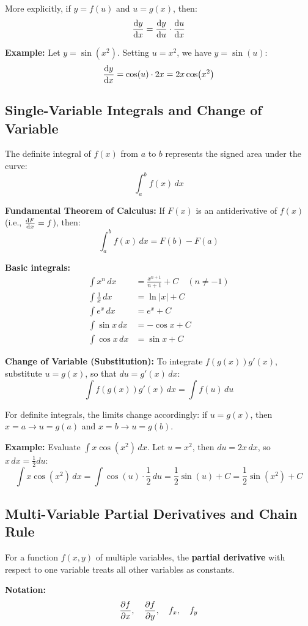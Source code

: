 More explicitly, if $y = f(u)$ and $u = g(x)$, then:
\[
\dv{y}{x} = \dv{y}{u} \cdot \dv{u}{x}
\]

\textbf{Example:} Let $y = \sin(x^2)$. Setting $u = x^2$, we have $y = \sin(u)$:
\[
\dv{y}{x} = \cos(u) \cdot 2x = 2x\cos(x^2)
\]

\subsection{Single-Variable Integrals and Change of Variable}

The definite integral of $f(x)$ from $a$ to $b$ represents the signed area under the curve:
\[
\int_a^b f(x) \, dx
\]

\textbf{Fundamental Theorem of Calculus:} If $F(x)$ is an antiderivative of $f(x)$ (i.e., $\dv{F}{x} = f$), then:
\[
\int_a^b f(x) \, dx = F(b) - F(a)
\]

\textbf{Basic integrals:}
\begin{align*}
\int x^n \, dx &= \frac{x^{n+1}}{n+1} + C \quad (n \neq -1) \\
\int \frac{1}{x} \, dx &= \ln|x| + C \\
\int e^x \, dx &= e^x + C \\
\int \sin x \, dx &= -\cos x + C \\
\int \cos x \, dx &= \sin x + C
\end{align*}

\textbf{Change of Variable (Substitution):} To integrate $f(g(x))g'(x)$, substitute $u = g(x)$, so that $du = g'(x) \, dx$:
\[
\int f(g(x)) g'(x) \, dx = \int f(u) \, du
\]

For definite integrals, the limits change accordingly: if $u = g(x)$, then $x = a \to u = g(a)$ and $x = b \to u = g(b)$.

\textbf{Example:} Evaluate $\int x \cos(x^2) \, dx$. Let $u = x^2$, then $du = 2x \, dx$, so $x \, dx = \frac{1}{2} du$:
\[
\int x \cos(x^2) \, dx = \int \cos(u) \cdot \frac{1}{2} \, du = \frac{1}{2}\sin(u) + C = \frac{1}{2}\sin(x^2) + C
\]

\subsection{Multi-Variable Partial Derivatives and Chain Rule}

For a function $f(x, y)$ of multiple variables, the \textbf{partial derivative} with respect to one variable treats all other variables as constants.

\textbf{Notation:}
\[
\pdv{f}{x}, \quad \pdv{f}{y}, \quad f_x, \quad f_y
\]

